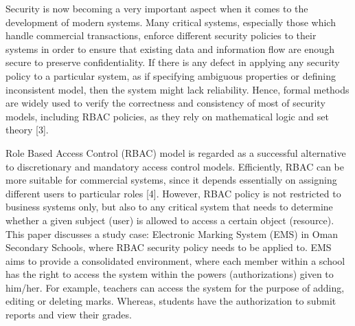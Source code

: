 Security is now becoming a very important aspect when it comes to the development of modern systems. Many critical systems, especially those which handle commercial transactions, enforce different security policies to their systems in order to ensure that existing data and information flow are enough secure to preserve confidentiality. If there is any defect in applying any security policy to a particular system, as if specifying ambiguous properties or defining inconsistent model, then the system might lack reliability. Hence, formal methods are widely used to verify the correctness and consistency of most of security models, including RBAC policies, as they rely on mathematical logic and set theory [3].

Role Based Access Control (RBAC) model is regarded as a successful alternative to discretionary and mandatory access control models.  Efficiently, RBAC can be more suitable for commercial systems, since it depends essentially on assigning different users to particular roles [4]. However, RBAC policy is not restricted to business systems only, but also to any critical system that needs to determine whether a given subject (user) is allowed to access a certain object (resource). 
This paper discusses a study case: Electronic Marking System (EMS) in Oman Secondary Schools, where RBAC security policy needs to be applied to.  EMS aims to provide a consolidated environment, where each member within a school has the right to access the system within the powers (authorizations) given to him/her. For example, teachers can access the system for the purpose of adding, editing or deleting marks.  Whereas, students have the authorization to submit reports and view their grades.

